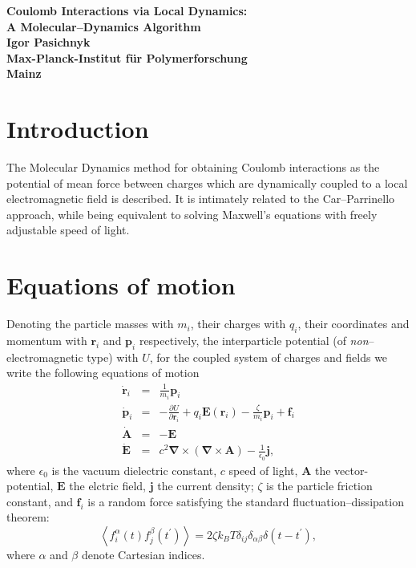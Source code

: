 \documentclass[a4paper, 12pt]{article}
\newcommand{\vect}[1]{\mathbf{#1}}
\begin{document}
{\huge{\bf Coulomb Interactions via Local Dynamics: \\
A Molecular--Dynamics Algorithm}}\\
\vspace{0.2cm}
{\bf {\large Igor Pasichnyk\\
Max-Planck-Institut f\"ur Polymerforschung\\
Mainz}}
%
\section{Introduction}
%
The Molecular Dynamics method for obtaining Coulomb interactions as
the potential of mean force between charges which are dynamically
coupled to a local electromagnetic field is described. It is
intimately related to the Car--Parrinello approach, while being
equivalent to solving Maxwell's equations with freely adjustable speed
of light.
%
\section{Equations of motion}
%
Denoting the particle masses with $m_i$, their charges with $q_i$, their coordinates and momentum with $\vect
r_i$ and $\vect p_i$ respectively, the interparticle potential (of {\em non}--electromagnetic
type) with $U$,  for the coupled system of charges and fields we write the following equations of motion
%
\begin{eqnarray} 
  \dot{\vect r}_i & = & \frac{1}{m_i} \vect p_i \\
  \dot{\vect p}_i & = & - \frac{\partial U}{\partial \vect r_i} + q_i \vect E (\vect r_i)- \frac{\zeta}{m_i} \vect p_i
                        + \vect f_i \\
  \dot{\vect A} & = & - \vect E \\
  \dot{\vect E} & = & 
  c^2 \vect \nabla \times \left( \vect \nabla \times \vect A \right)
  - \frac{1}{\epsilon_0} \vect j ,
\end{eqnarray}
%
where $\epsilon_0$ is the vacuum dielectric constant, $c$ speed of light, $\vect A$ the vector-potential, $\vect E$ the elctric field, $\vect j$ the current
density; $\zeta$ is the particle friction constant, and $\vect f_i$ is a
random force satisfying the standard fluctuation--dissipation theorem:
%
\begin{equation}
\left< f_i^\alpha (t) f_j^\beta (t^\prime) \right> =
2 \zeta k_B T \delta_{ij} \delta_{\alpha \beta}
\delta (t - t^\prime),
\end{equation}
%
where $\alpha$ and $\beta$ denote Cartesian indices.
\end{document}
